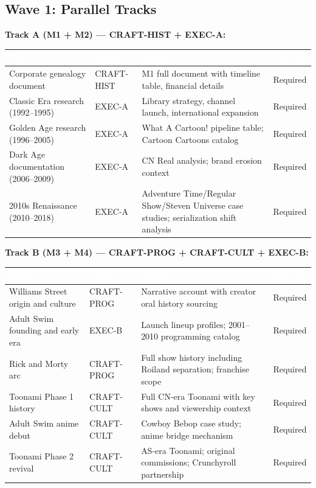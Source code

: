 \documentclass[11pt,letterpaper]{article}
\newcommand{\tableheader}[1]{\textbf{\sffamily\textcolor{white}{#1}}}
\begin{document}
\subsection{Wave 1: Parallel Tracks}

\textbf{Track A (M1 + M2) --- CRAFT-HIST + EXEC-A:}

\begin{center}
\begin{tabularx}{\textwidth}{L{3cm}L{3cm}XL{2.5cm}}
\toprule
{}
\tableheader{Task} & \tableheader{Agent} & \tableheader{Output} & \tableheader{Priority} \\
\midrule
Corporate genealogy document & CRAFT-HIST & M1 full document with timeline table, financial details & Required \\
Classic Era research (1992--1995) & EXEC-A & Library strategy, channel launch, international expansion & Required \\
Golden Age research (1996--2005) & EXEC-A & What A Cartoon! pipeline table; Cartoon Cartoons catalog & Required \\
Dark Age documentation (2006--2009) & EXEC-A & CN Real analysis; brand erosion context & Required \\
2010s Renaissance (2010--2018) & EXEC-A & Adventure Time/Regular Show/Steven Universe case studies; serialization shift analysis & Required \\
\bottomrule
\end{tabularx}
\end{center}

\textbf{Track B (M3 + M4) --- CRAFT-PROG + CRAFT-CULT + EXEC-B:}

\begin{center}
\begin{tabularx}{\textwidth}{L{3.5cm}L{3cm}XL{2.5cm}}
\toprule
{}
\tableheader{Task} & \tableheader{Agent} & \tableheader{Output} & \tableheader{Priority} \\
\midrule
Williams Street origin and culture & CRAFT-PROG & Narrative account with creator oral history sourcing & Required \\
Adult Swim founding and early era & EXEC-B & Launch lineup profiles; 2001--2010 programming catalog & Required \\
Rick and Morty arc & CRAFT-PROG & Full show history including Roiland separation; franchise scope & Required \\
Toonami Phase 1 history & CRAFT-CULT & Full CN-era Toonami with key shows and viewership context & Required \\
Adult Swim anime debut & CRAFT-CULT & Cowboy Bebop case study; anime bridge mechanism & Required \\
Toonami Phase 2 revival & CRAFT-CULT & AS-era Toonami; original commissions; Crunchyroll partnership & Required \\
\bottomrule
\end{tabularx}
\end{center}
\end{document}
